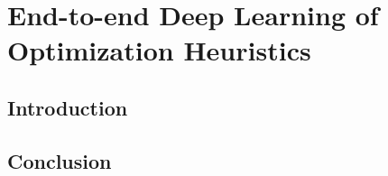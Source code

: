 \ifstapled
\chapter{End-to-end Deep Learning of Optimization Heuristics}
\section{Introduction}
\lipsum[1-2]

\section{Conclusion}
\lipsum[1-2]
\else

\fi

